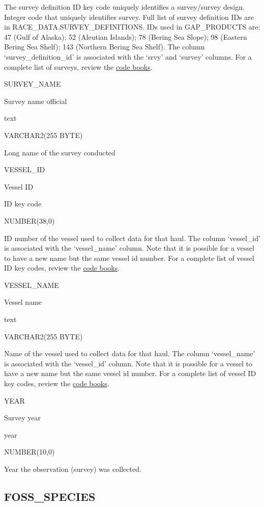 \documentclass[
  letterpaper,
  oneside,
  open=any]{scrbook}
\begin{document}
The survey definition ID key code uniquely identifies a survey/survey
design. Integer code that uniquely identifies survey. Full list of
survey definition IDs are in RACE\_DATA.SURVEY\_DEFINITIONS. IDs used in
GAP\_PRODUCTS are: 47 (Gulf of Alaska); 52 (Aleutian Islands); 78
(Bering Sea Slope); 98 (Eastern Bering Sea Shelf); 143 (Northern Bering
Sea Shelf). The column `survey\_definition\_id' is associated with the
`srvy' and `survey' columns. For a complete list of surveys, review the
\href{https://www.fisheries.noaa.gov/resource/document/groundfish-survey-species-code-manual-and-data-codes-manual}{code
books}.

SURVEY\_NAME

Survey name official

text

VARCHAR2(255 BYTE)

Long name of the survey conducted

VESSEL\_ID

Vessel ID

ID key code

NUMBER(38,0)

ID number of the vessel used to collect data for that haul. The column
`vessel\_id' is associated with the `vessel\_name' column. Note that it
is possible for a vessel to have a new name but the same vessel id
number. For a complete list of vessel ID key codes, review the
\href{https://www.fisheries.noaa.gov/resource/document/groundfish-survey-species-code-manual-and-data-codes-manual}{code
books}.

VESSEL\_NAME

Vessel name

text

VARCHAR2(255 BYTE)

Name of the vessel used to collect data for that haul. The column
`vessel\_name' is associated with the `vessel\_id' column. Note that it
is possible for a vessel to have a new name but the same vessel id
number. For a complete list of vessel ID key codes, review the
\href{https://www.fisheries.noaa.gov/resource/document/groundfish-survey-species-code-manual-and-data-codes-manual}{code
books}.

YEAR

Survey year

year

NUMBER(10,0)

Year the observation (survey) was collected.

\hypertarget{foss_species}{%
\subsection{FOSS\_SPECIES}\label{foss_species}}
\end{document}
